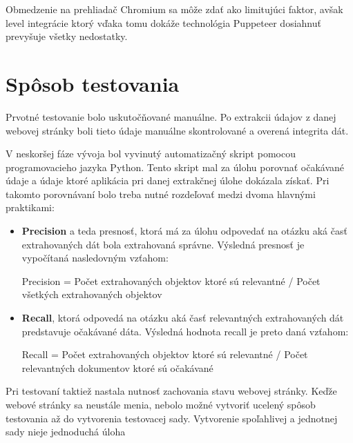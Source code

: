 Obmedzenie na prehliadač Chromium sa môže zdať ako limitujúci faktor, avšak level integrácie ktorý vďaka tomu dokáže technológia Puppeteer dosiahnuť prevyšuje všetky nedostatky.

\section{Spôsob testovania}

Prvotné testovanie bolo uskutočňované manuálne. Po extrakcii údajov z danej webovej stránky boli tieto údaje manuálne skontrolované a overená integrita dát. 

V neskoršej fáze vývoja bol vyvinutý automatizačný skript pomocou programovacieho jazyka Python. Tento skript mal za úlohu porovnať očakávané údaje a údaje ktoré aplikácia pri danej extrakčnej úlohe dokázala získať. Pri takomto porovnávaní bolo treba nutné rozdeľovať medzi dvoma hlavnými praktikami\cite{precrecall}:

\begin{itemize}
    \item \textbf{Precision} a teda presnosť, ktorá má za úlohu odpovedať na otázku aká časť extrahovaných dát bola extrahovaná správne. Výsledná presnosť je vypočítaná nasledovným vzťahom:
   
    Precision  =   Počet extrahovaných objektov ktoré sú relevantné / Počet všetkých extrahovaných objektov
    
    \item \textbf{Recall}, ktorá odpovedá na otázku aká časť relevantných extrahovaných dát predstavuje očakávané dáta. Výsledná hodnota recall je preto daná vzťahom:
    
    Recall = Počet extrahovaných objektov ktoré sú relevantné / Počet relevantných dokumentov ktoré sú očakávané
\end{itemize}


Pri testovaní taktiež nastala nutnosť zachovania stavu webovej stránky. Keďže webové stránky sa neustále menia, nebolo možné vytvoriť ucelený spôsob testovania až do vytvorenia testovacej sady. Vytvorenie spoľahlivej a jednotnej sady nieje jednoduchá úloha
